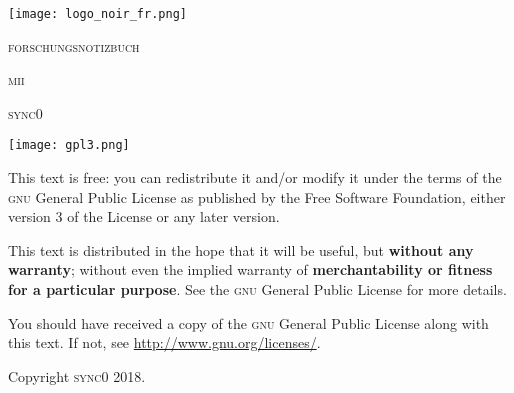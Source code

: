 \begin{titlepage}
 \centering
 \texttt{[image: logo\_noir\_fr.png]}\par
 \vspace{4\baselineskip}
 {\huge\HUGE \textsc{forschungsnotizbuch}\par}
 \vspace{4\baselineskip}
 {\LARGE \textsc{mii}\par}
 \vspace{4\baselineskip}
 {\Large \textsc{sync0}\par}
 \vfill
\end{titlepage}

\vspace*{\fill}
\noindent
\texttt{[image: gpl3.png]}\par
\vspace{1\baselineskip}
This text is free: you can redistribute it and/or modify it
under the terms of the \textsc{gnu} General Public License as published by
the Free Software Foundation, either version 3 of the License or any later
version.

This text is distributed in the hope that it will be useful, but \textbf{without
any warranty}; without even the implied warranty of \textbf{merchantability or 
fitness for a particular purpose}. See the \textsc{gnu} General 
Public License for more details.

You should have received a copy of the \textsc{gnu} General Public License along
with this text. If not, see \url{http://www.gnu.org/licenses/}.

\vspace{1\baselineskip}
\noindent
Copyright \textcopyright \textsc{sync0} 2018. 
\thispagestyle{empty}

\newpage
\tableofcontents 
\pagestyle{empty}

\newpage
\pagestyle{scrheadings}